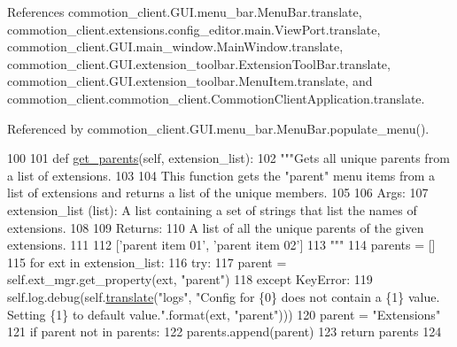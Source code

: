 References commotion\+\_\+client.\+G\+U\+I.\+menu\+\_\+bar.\+Menu\+Bar.\+translate, commotion\+\_\+client.\+extensions.\+config\+\_\+editor.\+main.\+View\+Port.\+translate, commotion\+\_\+client.\+G\+U\+I.\+main\+\_\+window.\+Main\+Window.\+translate, commotion\+\_\+client.\+G\+U\+I.\+extension\+\_\+toolbar.\+Extension\+Tool\+Bar.\+translate, commotion\+\_\+client.\+G\+U\+I.\+extension\+\_\+toolbar.\+Menu\+Item.\+translate, and commotion\+\_\+client.\+commotion\+\_\+client.\+Commotion\+Client\+Application.\+translate.



Referenced by commotion\+\_\+client.\+G\+U\+I.\+menu\+\_\+bar.\+Menu\+Bar.\+populate\+\_\+menu().


\begin{DoxyCode}
100 
101     \textcolor{keyword}{def }\hyperlink{classcommotion__client_1_1GUI_1_1menu__bar_1_1MenuBar_a963ca3542a8f9ee6c8e8534fe530d443}{get\_parents}(self, extension\_list):
102         \textcolor{stringliteral}{"""Gets all unique parents from a list of extensions.}
103 \textcolor{stringliteral}{}
104 \textcolor{stringliteral}{        This function gets the "parent" menu items from a list of extensions and returns a list of the
       unique members.}
105 \textcolor{stringliteral}{}
106 \textcolor{stringliteral}{        Args:}
107 \textcolor{stringliteral}{          extension\_list (list): A list containing a set of strings that list the names of extensions.}
108 \textcolor{stringliteral}{}
109 \textcolor{stringliteral}{        Returns:}
110 \textcolor{stringliteral}{          A list of all the unique parents of the given extensions.}
111 \textcolor{stringliteral}{        }
112 \textcolor{stringliteral}{            ['parent item 01', 'parent item 02']}
113 \textcolor{stringliteral}{        """}
114         parents = []
115         \textcolor{keywordflow}{for} ext \textcolor{keywordflow}{in} extension\_list:
116             \textcolor{keywordflow}{try}:
117                 parent = self.ext\_mgr.get\_property(ext, \textcolor{stringliteral}{"parent"})
118             \textcolor{keywordflow}{except} KeyError:
119                 self.log.debug(self.\hyperlink{classcommotion__client_1_1GUI_1_1menu__bar_1_1MenuBar_ad97dbe989a68d0453584c7c95137b8b4}{translate}(\textcolor{stringliteral}{"logs"}, \textcolor{stringliteral}{"Config for \{0\} does not contain a \{1\}
       value. Setting \{1\} to default value."}.format(ext, \textcolor{stringliteral}{"parent"})))
120                 parent = \textcolor{stringliteral}{"Extensions"}
121             \textcolor{keywordflow}{if} parent \textcolor{keywordflow}{not} \textcolor{keywordflow}{in} parents:
122                 parents.append(parent)
123         \textcolor{keywordflow}{return} parents
124 

\end{DoxyCode}

